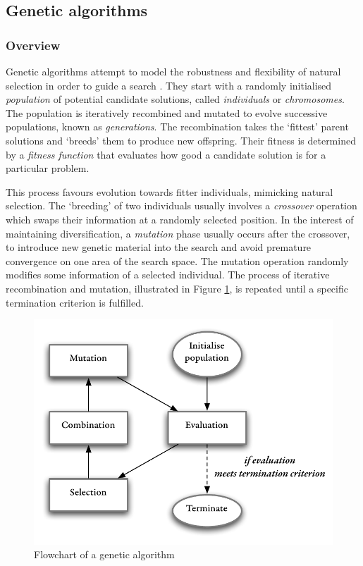 \subsection{Genetic algorithms}

\subsubsection{Overview}
Genetic algorithms attempt to model the robustness and flexibility of natural selection in order to guide a search \cite{michael2001generating}. They start with a randomly initialised \emph{population} of potential candidate solutions, called \emph{individuals} or \emph{chromosomes}. The population is iteratively recombined and mutated to evolve successive populations, known as \emph{generations}. The recombination takes the `fittest' parent solutions and `breeds' them to produce new offspring. Their fitness is determined by a \emph{fitness function} that evaluates how good a candidate solution is for a particular problem.

This process favours evolution towards fitter individuals, mimicking natural selection. The `breeding' of two individuals usually involves a \emph{crossover} operation which swaps their information at a randomly selected position. In the interest of maintaining diversification, a \emph{mutation} phase usually occurs after the crossover, to introduce new genetic material into the search and avoid premature convergence on one area of the search space. The mutation operation randomly modifies some information of a selected individual. The process of iterative recombination and mutation, illustrated in Figure \ref{ga}, is repeated until a specific termination criterion is fulfilled.

\begin{figure}
\hspace*{0.7cm}
\centering
\includegraphics[scale=0.7]{./components/chapter2/ga.pdf}
\caption{Flowchart of a genetic algorithm}
\label{ga}
\end{figure}

